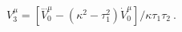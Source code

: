 \begin{equation} \label{l81-21}
V_3^{\mu}=[\stackrel{...}V_0^{\mu}-(\kappa ^2-\tau _1^2)\dot V_0^{\mu}]/\kappa \tau _1 \tau _2~.
\end{equation}

